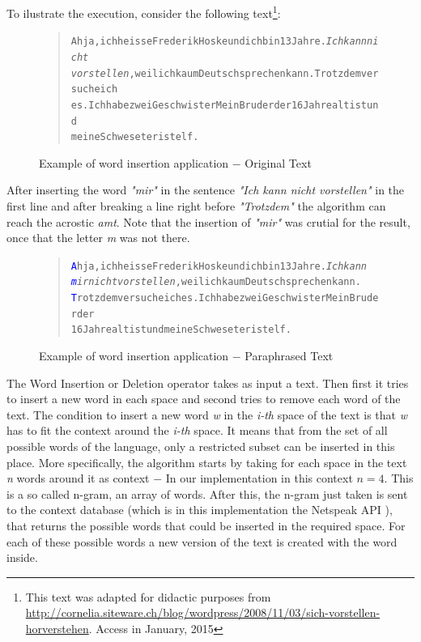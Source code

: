 \documentclass{reportAlternative}
\begin{document}
To ilustrate the execution, consider the following text\footnote{This text was adapted for didactic purposes from \url{http://cornelia.siteware.ch/blog/wordpress/2008/11/03/sich-vorstellen-horverstehen}. Access in January, 2015}:

\begin{figure}[H]
\begin{quote}
\begin{alltt}
Ah ja, ich heisse Frederik Hoske und ich bin 13 Jahre. \textit{Ich kann nicht
vorstellen}, weil ich kaum Deutsch sprechen kann. Trotzdem versuche ich
es. Ich habe zwei Geschwister Mein Bruder der 16 Jahre alt ist und
meine Schweseter ist elf.
\end{alltt}
\end{quote}
\caption{Example of word insertion application $-$ Original Text}
\end{figure}

After inserting the word \emph{"mir"} in the sentence \emph{"Ich kann nicht vorstellen"} in the first line and after breaking a line right before \emph{"Trotzdem"} the algorithm can reach the acrostic \emph{amt}. Note that the insertion of \emph{"mir"} was crutial for the result, once that the letter \emph{m} was not there.

\begin{figure}[H]
\begin{quote}
\begin{alltt}
\textcolor{Blue}{A}h ja, ich heisse Frederik Hoske und ich bin 13 Jahre. \textit{Ich kann
\textcolor{Blue}{m}ir nicht vorstellen}, weil ich kaum Deutsch sprechen kann.
\textcolor{Blue}{T}rotzdem versuche ich es. Ich habe zwei Geschwister Mein Bruder der
16 Jahre alt ist und meine Schweseter ist elf.
\end{alltt}
\end{quote}
\caption{Example of word insertion application $-$ Paraphrased Text}
\end{figure}

The Word Insertion or Deletion operator takes as input a text. Then first it tries to insert a new word in each space and second tries to remove each word of the text. The condition to insert a new word \emph{w} in the \emph{i-th} space of the text is that \emph{w} has to fit the context around the \emph{i-th} space. It means that from the set of all possible words of the language, only a restricted subset can be inserted in this place. More specifically, the algorithm starts by taking for each space in the text \emph{n} words around it as context $-$ In our implementation in this context $n = 4$. This is a so called n-gram, an array of words. After this, the n-gram just taken is sent to the context database (which is in this implementation the Netspeak API \cite{Netspeak}), that returns the possible words that could be inserted in the required space. For each of these possible words a new version of the text is created with the word inside. \par
\end{document}
